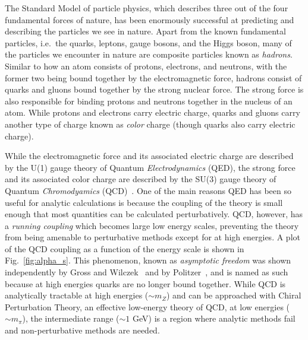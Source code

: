 The Standard Model of particle physics, which describes three out of the four fundamental forces of nature, has been enormously successful at predicting and describing the particles we see in nature. Apart from the known fundamental particles, i.e.\ the quarks, leptons, gauge bosons, and the Higgs boson, many of the particles we encounter in nature are composite particles known as \emph{hadrons}. Similar to how an atom consists of protons, electrons, and neutrons, with the former two being bound together by the electromagnetic force, hadrons consist of quarks and gluons bound together by the strong nuclear force. The strong force is also responsible for binding protons and neutrons together in the nucleus of an atom.  While protons and electrons carry electric charge, quarks and gluons carry another type of charge known as \emph{color} charge (though quarks also carry electric charge).

While the electromagnetic force and its associated electric charge are described by the U(1) gauge theory of Quantum \emph{Electrodynamics} (QED), the strong force and its associated color charge are described by the SU(3) gauge theory of Quantum \emph{Chromodyamics} (QCD)~\cite{Fritzsch:1973pi}. One of the main reasons QED has been so useful for analytic calculations is because the coupling of the theory is small enough that most quantities can be calculated perturbatively. QCD, however, has a \emph{running coupling} which becomes large low energy scales, preventing the theory from being amenable to perturbative methods except for at high energies. A plot of the QCD coupling as a function of the energy scale is shown in Fig.~\ref{fig:alpha_s}. This phenomenon, known as \emph{asymptotic freedom} was shown independently by Gross and Wilczek~\cite{Gross:1973id} and by Politzer~\cite{Politzer:1973fx}, and is named as such because at high energies quarks are no longer bound together. While QCD is analytically tractable at high energies ($\sim m_Z$) and can be approached with Chiral Perturbation Theory, an effective low-energy theory of QCD, at low energies ($\sim m_\pi$), the intermediate range ($\sim 1$ GeV) is a region where analytic methods fail and non-perturbative methods are needed.

